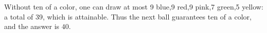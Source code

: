 Without ten of a color, one can draw at most 9 blue,9 red,9 pink,7 green,5 yellow: a total of 39, which is attainable. Thus the next ball guarantees ten of a color, and the answer is $\boxed{40}$.
